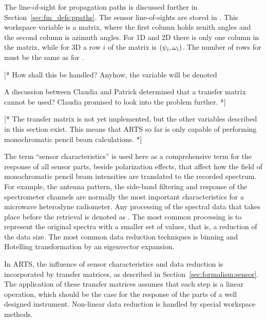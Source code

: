 The line-of-sight for propagation paths is discussed further in
Section~\ref{sec:fm_defs:ppaths}. The sensor line-of-sights are stored in
. This workspace variable is a matrix, where the
first column holds zenith angles and the second column is azimuth
angles. For 1D and 2D there is only one column in the matrix, while
for 3D a row $i$ of the matrix is $(\psi_{i},\omega_{i})$. The
number of rows for  must be the same as for
.


\label{sec:fm_defs:sensorpol}

[* How shall this be handled? Anyhow, the variable will be denoted

A discussion between Claudia and Patrick determined that a transfer
matrix cannot be used? Claudia promised to look into the problem further. *]


\label{sec:fm_defs:sensorchar}

[* The transfer matrix  is not yet implemented, but the other
variables described in this section exist. This means that ARTS so far
is only capable of performing monochromatic pencil beam calculations. *]

The term ``sensor characteristics'' 
is used here as a
comprehensive term for the response of all sensor parts, beside
polarization effects, that affect how the field of monochromatic
pencil beam intensities are translated to the recorded spectrum. For
example, the antenna pattern, the side-band filtering and response of
the spectrometer channels are normally the most important
characteristics for a microwave heterodyne radiometer. Any processing
of the spectral data that takes place before the retrieval is denoted
as . The most common processing is to represent
the original spectra with a smaller set of values, that is, a
reduction of the data size. The most common data reduction techniques
is binning and Hotelling transformation by an eigenvector expansion.

In ARTS, the influence of sensor characteristics and data reduction is 
incorporated by transfer matrices, as
described in Section~\ref{sec:formalism:sensor}. The application of
these transfer matrices assumes that each step is a linear operation,
which should be the case for the response of the parts of a well
designed instrument. Non-linear data reduction is handled by special
workspace methods.

